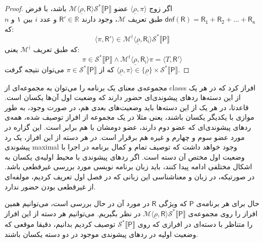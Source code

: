 \begin{proof}
	اگر زوج
	$\langle \underline{\rho}, \pi \rangle$ 
	عضو 
	$\mathcal{M}\langle \underline{\rho},\mathsf{R} \rangle \mathcal{S}^* \llbracket \mathsf{P} \rrbracket $
	باشد، با فرض 
	$\mathsf{dnf(R)=R_1+R_2+...+R_n}$
	طبق تعریف 
	$\mathcal{M}$،
	 وجود دارند $\mathsf{R'} \in \mathbb{R}$ و عدد $i$ بین ۱ و $n$ که: 
	$$\langle \pi , \mathsf{R'} \rangle \in \mathcal{M}^\nmid \langle \underline{\rho},\mathsf{R_i} \rangle \mathcal{S}^* \llbracket \mathsf{P} \rrbracket$$
	که طبق تعریف $\mathcal{M^\nmid}$ یعنی: 
	$$\pi \in \mathcal{S}^* \llbracket \mathsf{P} \rrbracket \land \mathcal{M}^t \langle \underline{\rho},\mathsf{R_i}\rangle \pi = \langle \mathit{T},\mathsf{R'} \rangle$$
که از 
$\pi \in \mathcal{S}^* \llbracket \mathsf{P} \rrbracket$
می‌توان نتیجه گرفت 
$\langle \underline{\rho}, \pi \rangle \in \{\underline{\rho}\} \times \mathcal{S}^* \llbracket \mathsf{P} \rrbracket$.

\end{proof}


مجموعه‌ی معنای یک برنامه را می‌توان به مجموعه‌ای از \glspl*{class} افراز کرد که در هر یک از این دسته‌ها ردهای پیشوندی‌ای حضور دارند که وضعیت اول آن‌ها یکسان است. قاعدتا، در هر یک از این دسته‌ها باید وضعیت‌های بعدی هم، در صورت وجود، به طور موازی با یکدیگر یکسان باشند، یعنی مثلا در یک مجموعه از افراز توصیف شده، همه‌ی ردهای پیشوندی‌ای که عضو دوم دارند، عضو دومشان با هم برابر است. این گزاره در مورد عضو سوم و چهارم و غیره هم برقرار است. در هر دسته از این افراز، یک رد پیشوندی \gls{maximal} وجود خواهد داشت که توصیف تمام و کمال برنامه در اجرا با وضعیت اول مختص آن دسته است.
اگر ردهای پیشوندی با محیط اولیه‌ی یکسان به اشکال مختلفی ادامه پیدا کنند، باید زبان برنامه نویسی مورد بررسی غیرقطعی باشد. در صورتیکه، در زبان و معناشناسی این زبانی که در فصل اول تعریف کردیم، مولفه‌ای از غیرقطعی بودن حضور ندارد.

حال برای هر برنامه‌ی $\mathsf{P}$ که ویژگی $\mathsf{R}$ در مورد آن در حال بررسی است، می‌توانیم همین افراز را روی مجموعه‌ی 
$\mathcal{M} \langle \underline{\rho}, \mathsf{R} \rangle \mathcal{S}^* \llbracket \mathsf{P} \rrbracket$
در نظر بگیریم. می‌توانیم هر دسته از این افراز را متناظر با دسته‌ای در افرازی که روی 
$\mathcal{S}^* \llbracket \mathsf{P}\rrbracket$ 
توصیف کردیم بدانیم، دقیقا موقعی که وضعیت اولیه در ردهای پیشوندی موجود در دو دسته یکسان باشند.

